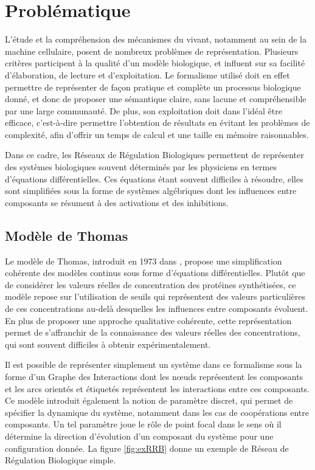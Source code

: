 
\chapter{Problématique}


L'étude et la compréhension des mécanismes du vivant, notamment au sein de la machine cellulaire, posent de nombreux problèmes de représentation.
Plusieurs critères participent à la qualité d'un modèle biologique, et influent sur sa facilité d'élaboration, de lecture et d'exploitation.
Le formalisme utilisé doit en effet permettre de représenter de façon pratique et complète un processus biologique donné, et donc
de proposer une sémantique claire, sans lacune et compréhensible par une large communauté.
De plus, son exploitation doit dans l'idéal être efficace, c'est-à-dire permettre l'obtention de résultats en évitant les problèmes de complexité, afin d'offrir un temps de calcul et une taille en mémoire raisonnables.

Dans ce cadre, les Réseaux de Régulation Biologiques permettent de représenter des systèmes biologiques souvent déterminés par les physiciens en termes d'équations différentielles.
Ces équations étant souvent difficiles à résoudre, elles sont simplifiées sous la forme de systèmes algébriques dont les influences entre composants se résument à des activations et des inhibitions.

\section{Modèle de Thomas}
Le modèle de Thomas, introduit en 1973 dans \cite{Thomas73}, propose une simplification cohérente des modèles continus sous forme d'équations différentielles.
Plutôt que de considérer les valeurs réelles de concentration des protéines synthétisées, ce modèle repose sur l'utilisation de seuils qui représentent des valeurs particulières de ces concentrations au-delà desquelles les influences entre composants évoluent.
En plus de proposer une approche qualitative cohérente, cette représentation permet de s'affranchir de la connaissance des valeurs réelles des concentrations, qui sont souvent difficiles à obtenir expérimentalement.

Il est possible de représenter simplement un système dans ce formalisme sous la forme d'un Graphe des Interactions dont les nœuds représentent les composants et les arcs orientés et étiquetés représentent les interactions entre ces composants.
Ce modèle introduit également la notion de paramètre discret, qui permet de spécifier la dynamique du système, notamment dans les cas de coopérations entre composants.
Un tel paramètre joue le rôle de \og point focal \fg{} dans le sens où il détermine la direction d'évolution d'un composant du système pour une configuration donnée.
La figure \ref{fig:exRRB} donne un exemple de Réseau de Régulation Biologique simple.


